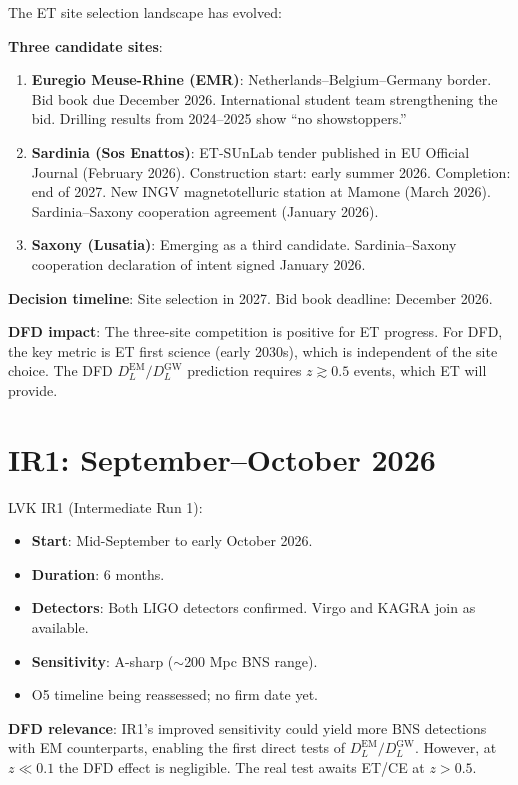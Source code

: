 \documentclass[11pt,a4paper]{article}
\newcommand{\NEW}{\textcolor{dfdblue}{\textbf{NEW}}}
\begin{document}
\begin{tcolorbox}[colback=blue!5!white, colframe=blue!60!black,
  title={ET Site Selection: EMR, Sardinia, and Now Saxony --- Decision in 2027}]

The ET site selection landscape has evolved:

\textbf{Three candidate sites}:
\begin{enumerate}
\item \textbf{Euregio Meuse-Rhine (EMR)}: Netherlands--Belgium--Germany border. Bid book due December 2026. International student team strengthening the bid. Drilling results from 2024--2025 show ``no showstoppers.''
\item \textbf{Sardinia (Sos Enattos)}: ET-SUnLab tender published in EU Official Journal (February 2026). Construction start: early summer 2026. Completion: end of 2027. New INGV magnetotelluric station at Mamone (March 2026). Sardinia--Saxony cooperation agreement (January 2026).
\item \textbf{Saxony (Lusatia)}: Emerging as a third candidate. Sardinia--Saxony cooperation declaration of intent signed January 2026.
\end{enumerate}

\textbf{Decision timeline}: Site selection in 2027. Bid book deadline: December 2026.

\textbf{DFD impact}: The three-site competition is positive for ET progress. For DFD, the key metric is ET first science (early 2030s), which is independent of the site choice. The DFD $D_L^{\text{EM}}/D_L^{\text{GW}}$ prediction requires $z \gtrsim 0.5$ events, which ET will provide.
\end{tcolorbox}

\section{IR1: September--October 2026}

\begin{tcolorbox}[colback=blue!5!white, colframe=blue!60!black,
  title={\NEW: IR1 Planning --- Six-Month Observing Run}]

LVK IR1 (Intermediate Run 1):
\begin{itemize}
\item \textbf{Start}: Mid-September to early October 2026.
\item \textbf{Duration}: 6 months.
\item \textbf{Detectors}: Both LIGO detectors confirmed. Virgo and KAGRA join as available.
\item \textbf{Sensitivity}: A-sharp ($\sim$200 Mpc BNS range).
\item O5 timeline being reassessed; no firm date yet.
\end{itemize}

\textbf{DFD relevance}: IR1's improved sensitivity could yield more BNS detections with EM counterparts, enabling the first direct tests of $D_L^{\text{EM}}/D_L^{\text{GW}}$. However, at $z \ll 0.1$ the DFD effect is negligible. The real test awaits ET/CE at $z > 0.5$.
\end{tcolorbox}
\end{document}
